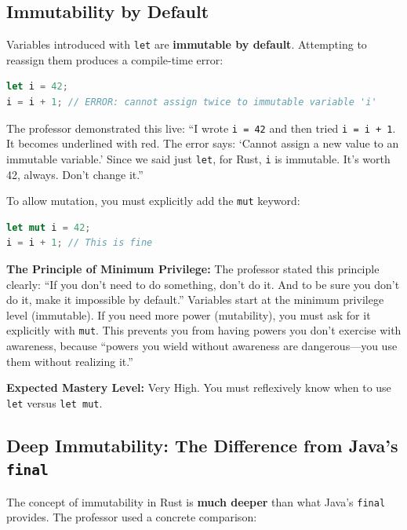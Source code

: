 \subsection{Immutability by Default}

Variables introduced with \texttt{let} are \textbf{immutable by default}. Attempting to reassign them produces a compile-time error:

\begin{lstlisting}[language=Rust]
let i = 42;
i = i + 1; // ERROR: cannot assign twice to immutable variable 'i'
\end{lstlisting}

The professor demonstrated this live: ``I wrote \texttt{i = 42} and then tried \texttt{i = i + 1}. It becomes underlined with red. The error says: `Cannot assign a new value to an immutable variable.' Since we said just \texttt{let}, for Rust, \texttt{i} is immutable. It's worth 42, always. Don't change it.''

To allow mutation, you must explicitly add the \texttt{mut} keyword:

\begin{lstlisting}[language=Rust]
let mut i = 42;
i = i + 1; // This is fine
\end{lstlisting}

\begin{examprioritybox}
\textbf{The Principle of Minimum Privilege:} The professor stated this principle clearly: ``If you don't need to do something, don't do it. And to be sure you don't do it, make it impossible by default.'' Variables start at the minimum privilege level (immutable). If you need more power (mutability), you must ask for it explicitly with \texttt{mut}. This prevents you from having powers you don't exercise with awareness, because ``powers you wield without awareness are dangerous---you use them without realizing it.''

\textbf{Expected Mastery Level:} Very High. You must reflexively know when to use \texttt{let} versus \texttt{let mut}.
\end{examprioritybox}

\subsection{Deep Immutability: The Difference from Java's \texttt{final}}

The concept of immutability in Rust is \textbf{much deeper} than what Java's \texttt{final} provides. The professor used a concrete comparison:

